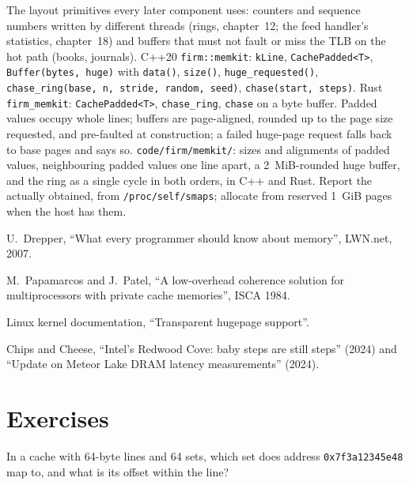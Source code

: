 \begin{build}
 The layout primitives every later component uses: counters and sequence numbers written by different
threads (rings, chapter~12; the feed handler's statistics, chapter~18) and buffers that must not fault or miss the TLB
on the hot path (books, journals).
 C++20 \texttt{firm::memkit}: \texttt{kLine}, \texttt{CachePadded<T>}, \texttt{Buffer(bytes,
huge)} with \texttt{data()}, \texttt{size()}, \texttt{huge\_requested()}, \texttt{chase\_ring(base, n, stride, random,
seed)}, \texttt{chase(start, steps)}. Rust \texttt{firm\_memkit}: \texttt{CachePadded<T>}, \texttt{chase\_ring},
\texttt{chase} on a byte buffer.
 Padded values occupy whole lines; buffers are page-aligned, rounded up to the page size requested, and
pre-faulted at construction; a failed huge-page request falls back to base pages and says so.
 \texttt{code/firm/memkit/}: sizes and alignments of padded values, neighbouring padded
values one line apart, a 2~MiB-rounded huge buffer, and the ring as a single cycle in both orders, in C++ and Rust.
 Report the  actually obtained, from \texttt{/proc/self/smaps}; allocate from reserved 1~GiB
pages when the host has them.
\end{build}

\begin{omsources}
\item U.~Drepper, ``What every programmer should know about memory'', LWN.net, 2007.
\item M.~Papamarcos and J.~Patel, ``A low-overhead coherence solution for multiprocessors with private cache memories'',
ISCA 1984.
\item Linux kernel documentation, ``Transparent hugepage support''.
\item Chips and Cheese, ``Intel's Redwood Cove: baby steps are still steps'' (2024) and ``Update on Meteor Lake DRAM
latency measurements'' (2024).
\end{omsources}

\section{Exercises}

\begin{exercise}[$\star$]\label{exo:ll:memory-hierarchy-and-caches:1}
In a cache with 64-byte lines and 64 sets, which set does address \texttt{0x7f3a12345e48} map to, and what is its offset
within the line?
\end{exercise}

